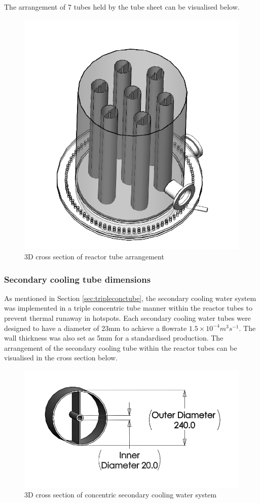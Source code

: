 The arrangement of 7 tubes held by the tube sheet can be visualised below.

\begin{figure}[H]
    \centering
    \includegraphics[width=0.49\linewidth]{chapters/2-reaction/figures/FYD reactor 7 tubes cross section 3D.PNG}
    \caption{3D cross section of reactor tube arrangement}
    \label{fig:reactortubearrangement}
\end{figure}

\subsubsection{Secondary cooling tube dimensions}
As mentioned in Section \ref{sec:tripleconctube}, the secondary cooling water system was implemented in a triple concentric tube manner within the reactor tubes to prevent thermal runaway in hotspots. Each secondary cooling water tubes were designed to have a diameter of 23mm to achieve a flowrate $1.5 \times 10^{-4} m^3 s^{-1}$. The wall thickness was also set as 5mm for a standardised production. 
The arrangement of the secondary cooling tube within the reactor tubes can be visualised in the cross section below. 
\begin{figure}[H]
    \centering
    \includegraphics[width=0.49\linewidth]{chapters/2-reaction/figures/FYD conc tube with calc bw.png} 
    \caption{3D cross section of concentric secondary cooling water system}
    \label{fig:concentriccoolingwater}
\end{figure}

